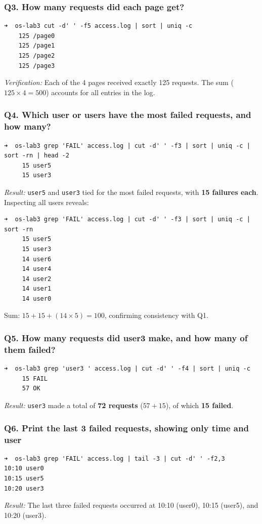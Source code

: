 \documentclass{labreport}
\begin{document}
\subsubsection*{Q3. How many requests did each page get?}
\begin{lstlisting}[style=bash]
➜  os-lab3 cut -d' ' -f5 access.log | sort | uniq -c
    125 /page0
    125 /page1
    125 /page2
    125 /page3
\end{lstlisting}
\textit{Verification:} Each of the 4 pages received exactly 125 requests. The sum ($125 \times 4 = 500$) accounts for all entries in the log.

\subsubsection*{Q4. Which user or users have the most failed requests, and how many?}
\begin{lstlisting}[style=bash]
➜  os-lab3 grep 'FAIL' access.log | cut -d' ' -f3 | sort | uniq -c | sort -rn | head -2
     15 user5
     15 user3
\end{lstlisting}
\textit{Result:} \texttt{user5} and \texttt{user3} tied for the most failed requests, with \textbf{15 failures each}. Inspecting all users reveals:
\begin{lstlisting}[style=bash]
➜  os-lab3 grep 'FAIL' access.log | cut -d' ' -f3 | sort | uniq -c | sort -rn
     15 user5
     15 user3
     14 user6
     14 user4
     14 user2
     14 user1
     14 user0
\end{lstlisting}
Sum: $15 + 15 + (14 \times 5) = 100$, confirming consistency with Q1.

\subsubsection*{Q5. How many requests did user3 make, and how many of them failed?}
\begin{lstlisting}[style=bash]
➜  os-lab3 grep 'user3 ' access.log | cut -d' ' -f4 | sort | uniq -c
     15 FAIL
     57 OK
\end{lstlisting}
\textit{Result:} \texttt{user3} made a total of \textbf{72 requests} ($57 + 15$), of which \textbf{15 failed}.

\subsubsection*{Q6. Print the last 3 failed requests, showing only time and user}
\begin{lstlisting}[style=bash]
➜  os-lab3 grep 'FAIL' access.log | tail -3 | cut -d' ' -f2,3
10:10 user0
10:15 user5
10:20 user3
\end{lstlisting}
\textit{Result:} The last three failed requests occurred at 10:10 (user0), 10:15 (user5), and 10:20 (user3).
\end{document}
